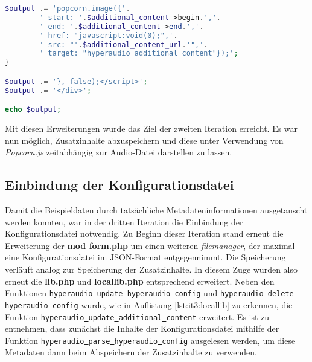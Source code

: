 \begin{lstlisting}[language=php,
             linewidth=\textwidth,
             caption={Ausschnitt der \textbf{renderer.php} in der 2. Iteration},
             label={lst:it2:renderer}]
    $output .= 'popcorn.image({'.
        ' start: '.$additional_content->begin.','.
        ' end: '.$additional_content->end.','.
        ' href: "javascript:void(0);",'.
        ' src: "'.$additional_content_url.'",'.
        ' target: "hyperaudio_additional_content"});';
}

$output .= '}, false);</script>';
$output .= '</div>';

echo $output;
\end{lstlisting}

Mit diesen Erweiterungen wurde das Ziel der zweiten Iteration erreicht. Es war nun möglich, Zusatzinhalte abzuspeichern und diese unter Verwendung von \textit{Popcorn.js} zeitabhängig zur Audio-Datei darstellen zu lassen.

\subsection{Einbindung der Konfigurationsdatei}
Damit die Beispieldaten durch tatsächliche Metadateninformationen ausgetauscht werden konnten, war in der dritten Iteration die Einbindung der Konfigurationsdatei notwendig. Zu Beginn dieser Iteration stand erneut die Erweiterung der \textbf{mod\underline{{ }}form.php} um einen weiteren \textit{filemanager}, der maximal eine Konfigurationsdatei im JSON-Format entgegennimmt. Die Speicherung verläuft analog zur Speicherung der Zusatzinhalte. In diesem Zuge wurden also erneut die \textbf{lib.php} und \textbf{locallib.php} entsprechend erweitert. Neben den Funktionen \texttt{hyperaudio\underline{{ }}update\underline{{ }}hyperaudio\underline{{ }}config} und \texttt{hyperaudio\underline{{ }}delete\underline{{ }}hyperaudio\underline{{ }}config} wurde, wie in Auflistung \ref{lst:it3:locallib} zu erkennen, die Funktion \texttt{hyperaudio\underline{{ }}update\underline{{ }}additional\underline{{ }}content} erweitert. Es ist zu entnehmen, dass zunächst die Inhalte der Konfigurationsdatei mithilfe der Funktion \texttt{hyperaudio\underline{{ }}parse\underline{{ }}hyperaudio\underline{{ }}config} ausgelesen werden, um diese Metadaten dann beim Abspeichern der Zusatzinhalte zu verwenden.

